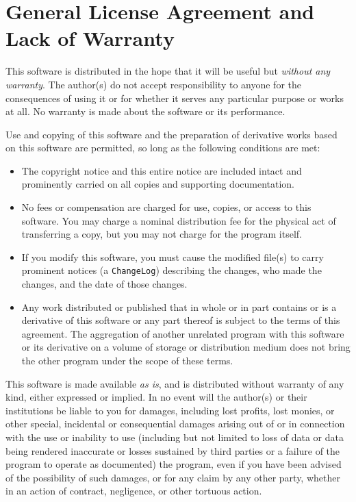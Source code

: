\section*{General License Agreement and Lack of Warranty\label{licence}}%
This software is distributed in the hope that it will be useful
but \emph{without any warranty}. The author(s) do not accept responsibility
to anyone for the consequences of using it or for whether it serves
any particular purpose or works at all. No warranty is made about
the software or its performance.

Use and copying of this software and the preparation of derivative
works based on this software are permitted, so long as the following
conditions are met:
\begin{itemize}
\item
The copyright notice and this entire notice are included intact
and prominently carried on all copies and supporting documentation.
\item
No fees or compensation are charged for use, copies, or
access to this software. You may charge a nominal
distribution fee for the physical act of transferring a
copy, but you may not charge for the program itself.
\item
If you modify this software, you must cause the modified
file(s) to carry prominent notices (a \texttt{ChangeLog})
describing the changes, who made the changes, and the date
of those changes.
\item
Any work distributed or published that in whole or in part
contains or is a derivative of this software or any part
thereof is subject to the terms of this agreement. The
aggregation of another unrelated program with this software
or its derivative on a volume of storage or distribution
medium does not bring the other program under the scope
of these terms.
\end{itemize}
This software is made available \emph{as is}, and is distributed without
warranty of any kind, either expressed or implied.
In no event will the author(s) or their institutions be liable to you
for damages, including lost profits, lost monies, or other special,
incidental or consequential damages arising out of or in connection
with the use or inability to use (including but not limited to loss of
data or data being rendered inaccurate or losses sustained by third
parties or a failure of the program to operate as documented) the
program, even if you have been advised of the possibility of such
damages, or for any claim by any other party, whether in an action of
contract, negligence, or other tortuous action.


